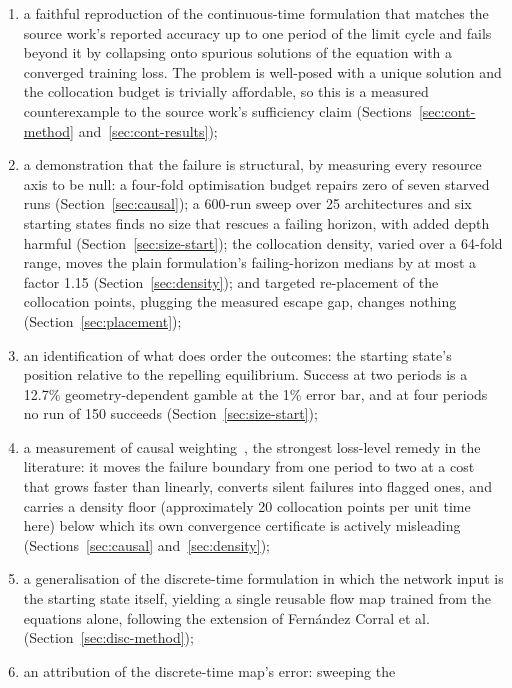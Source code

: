 \documentclass[11pt,a4paper]{article}
\begin{document}
\begin{enumerate}
  \item a faithful reproduction of the continuous-time formulation that
  matches the source work's reported accuracy up to one period of the limit
  cycle and fails beyond it by collapsing onto spurious solutions of the
  equation with a converged training loss. The problem is well-posed with a
  unique solution and the collocation budget is trivially affordable, so
  this is a measured counterexample to the source work's sufficiency claim
  (Sections~\ref{sec:cont-method} and~\ref{sec:cont-results});
  \item a demonstration that the failure is structural, by measuring every
  resource axis to be null: a four-fold optimisation budget repairs zero of
  seven starved runs (Section~\ref{sec:causal}); a 600-run sweep over 25
  architectures and six starting states finds no size that rescues a
  failing horizon, with added depth harmful
  (Section~\ref{sec:size-start}); the collocation density, varied over a
  64-fold range, moves the plain formulation's failing-horizon medians by
  at most a factor 1.15 (Section~\ref{sec:density}); and targeted
  re-placement of the collocation points, plugging the measured escape
  gap, changes nothing (Section~\ref{sec:placement});
  \item an identification of what does order the outcomes: the starting
  state's position relative to the repelling equilibrium. Success at two
  periods is a 12.7\% geometry-dependent gamble at the 1\% error bar, and
  at four periods no run of 150 succeeds (Section~\ref{sec:size-start});
  \item a measurement of causal weighting~\cite{wang2024causal}, the
  strongest loss-level remedy in the literature: it moves the failure
  boundary from one period to two at a cost that grows faster than
  linearly, converts silent failures into flagged ones, and carries a
  density floor (approximately 20 collocation points per unit time here)
  below which its own convergence certificate is actively misleading
  (Sections~\ref{sec:causal} and~\ref{sec:density});
  \item a generalisation of the discrete-time formulation in which the
  network input is the starting state itself, yielding a single reusable
  flow map trained from the equations alone, following the extension of
  Fern\'andez Corral et al.~\cite{fernandez2024}
  (Section~\ref{sec:disc-method});
  \item an attribution of the discrete-time map's error: sweeping the

\end{enumerate}
\end{document}
